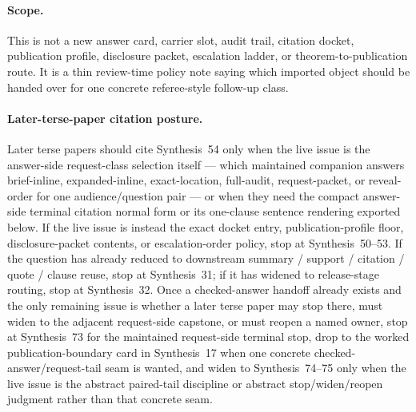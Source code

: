 \documentclass[11pt]{article}
\begin{document}
\paragraph{Scope.}
This is not a new answer card, carrier slot, audit trail, citation docket, publication profile, disclosure packet, escalation ladder, or theorem-to-publication route.
It is a thin review-time policy note saying which imported object should be handed over for one concrete referee-style follow-up class.

\paragraph{Later-terse-paper citation posture.}
Later terse papers should cite Synthesis~54 only when the live issue is the answer-side request-class selection itself --- which maintained companion answers \textsf{brief-inline}, \textsf{expanded-inline}, \textsf{exact-location}, \textsf{full-audit}, \textsf{request-packet}, or \textsf{reveal-order} for one audience/question pair --- or when they need the compact answer-side terminal citation normal form or its one-clause sentence rendering exported below. If the live issue is instead the exact docket entry, publication-profile floor, disclosure-packet contents, or escalation-order policy, stop at Synthesis~50--53. If the question has already reduced to downstream summary / support / citation / quote / clause reuse, stop at Synthesis~31; if it has widened to release-stage routing, stop at Synthesis~32. Once a checked-answer handoff already exists and the only remaining issue is whether a later terse paper may stop there, must widen to the adjacent request-side capstone, or must reopen a named owner, stop at Synthesis~73 for the maintained request-side terminal stop, drop to the worked publication-boundary card in Synthesis~17 when one concrete checked-answer/request-tail seam is wanted, and widen to Synthesis~74--75 only when the live issue is the abstract paired-tail discipline or abstract stop/widen/reopen judgment rather than that concrete seam.\cite{series:challengeanswercitationdockets,series:challengeanswerpublicationprofiles,series:challengeanswerdisclosurepackets,series:challengeanswerescalationladders,series:downstreamnormalforms,series:releasespine,series:workedexample,series:publicrequestresponsepacketrefreshresponsepacketclosureverdicts,series:pairedterminalcitationdiscipline,series:pairedterminalcutoverrules}
\end{document}
